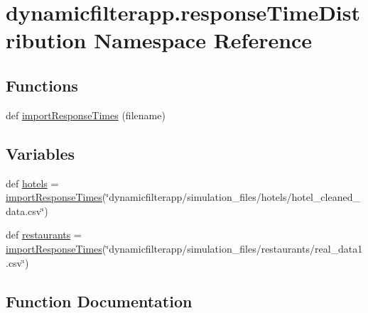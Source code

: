 \hypertarget{namespacedynamicfilterapp_1_1response_time_distribution}{}\section{dynamicfilterapp.\+response\+Time\+Distribution Namespace Reference}
\label{namespacedynamicfilterapp_1_1response_time_distribution}
\subsection*{Functions}
\begin{DoxyCompactItemize}
\item 
def \hyperlink{namespacedynamicfilterapp_1_1response_time_distribution_a99f5f079f782c55c2ecf267693ff59f4}{import\+Response\+Times} (filename)
\end{DoxyCompactItemize}
\subsection*{Variables}
\begin{DoxyCompactItemize}
\item 
def \hyperlink{namespacedynamicfilterapp_1_1response_time_distribution_a5dc6ecb2720239630808a8ab06ab1840}{hotels} = \hyperlink{namespacedynamicfilterapp_1_1response_time_distribution_a99f5f079f782c55c2ecf267693ff59f4}{import\+Response\+Times}(\char`\"{}dynamicfilterapp/simulation\+\_\+files/hotels/hotel\+\_\+cleaned\+\_\+data.\+csv\char`\"{})
\item 
def \hyperlink{namespacedynamicfilterapp_1_1response_time_distribution_a6caf9f682a37695b1f6baf64018c2994}{restaurants} = \hyperlink{namespacedynamicfilterapp_1_1response_time_distribution_a99f5f079f782c55c2ecf267693ff59f4}{import\+Response\+Times}(\char`\"{}dynamicfilterapp/simulation\+\_\+files/restaurants/real\+\_\+data1.\+csv\char`\"{})
\end{DoxyCompactItemize}


\subsection{Function Documentation}
\mbox{\label{namespacedynamicfilterapp_1_1response_time_distribution_a99f5f079f782c55c2ecf267693ff59f4}} 
